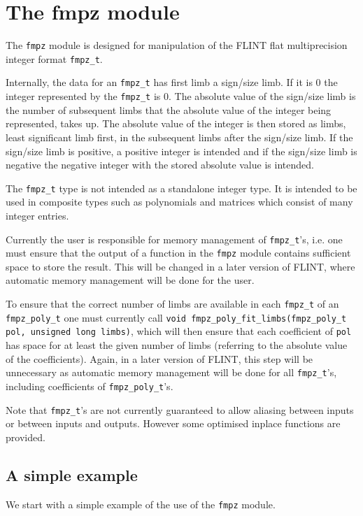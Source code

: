 \documentclass[a4paper,10pt]{article}
\newcommand{\code}{\lstinline}
\begin{document}
\section{The fmpz module}
The \code{fmpz} module is designed for manipulation of the FLINT flat multiprecision integer format \code{fmpz_t}. 

Internally, the data for an \code{fmpz_t} has first limb a sign/size limb. If it is 0 the integer represented by the \code{fmpz_t} is 0. The absolute value of the sign/size limb is the number of subsequent limbs that the absolute value of the integer being represented, takes up. The absolute value of the integer is then stored as limbs, least significant limb first, in the subsequent limbs after the sign/size limb. If the sign/size limb is positive, a positive integer is intended and if the sign/size limb is negative the negative integer with the stored absolute value is intended.

The \code{fmpz_t} type is not intended as a standalone integer type. It is intended to be used in composite types such as polynomials and matrices which consist of many integer entries. 

Currently the user is responsible for memory management of \code{fmpz_t}'s, i.e. one must ensure that the output of a function in the \code{fmpz} module contains sufficient space to store the result. This will be changed in a later version of FLINT, where automatic memory management will be done for the user. 

To ensure that the correct number of limbs are available in each \code{fmpz_t} of an \code{fmpz_poly_t} one must currently call \code{void fmpz_poly_fit_limbs(fmpz_poly_t pol, unsigned long limbs)}, which will then ensure that each coefficient of \code{pol} has space for at least the given number of limbs (referring to the absolute value of the coefficients). Again, in a later version of FLINT, this step will be unnecessary as automatic memory management will be done for all \code{fmpz_t}'s, including coefficients of \code{fmpz_poly_t}'s.

Note that \code{fmpz_t}'s are not currently guaranteed to allow aliasing between inputs or between inputs and outputs. However some optimised inplace functions are provided.

\subsection{A simple example}
We start with a simple example of the use of the \code{fmpz} module.
\end{document}
